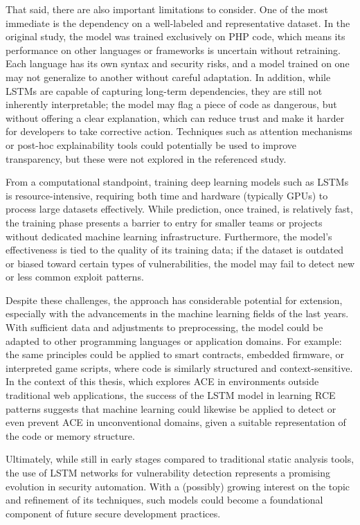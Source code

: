 \documentclass[a4paper]{usiinfbachelorproject}
\begin{document}
That said, there are also important limitations to consider. One of the most immediate is the dependency on a well-labeled and representative dataset. In the original study, the model was trained exclusively on PHP code, which means its performance on other languages or frameworks is uncertain without retraining. Each language has its own syntax and security risks, and a model trained on one may not generalize to another without careful adaptation. In addition, while LSTMs are capable of capturing long-term dependencies, they are still not inherently interpretable; the model may flag a piece of code as dangerous, but without offering a clear explanation, which can reduce trust and make it harder for developers to take corrective action. Techniques such as attention mechanisms or post-hoc explainability tools could potentially be used to improve transparency, but these were not explored in the referenced study.

From a computational standpoint, training deep learning models such as LSTMs is resource-intensive\cite{stacked-lstm-cost}, requiring both time and hardware (typically GPUs) to process large datasets effectively. While prediction, once trained, is relatively fast, the training phase presents a barrier to entry for smaller teams or projects without dedicated machine learning infrastructure. Furthermore, the model’s effectiveness is tied to the quality of its training data; if the dataset is outdated or biased toward certain types of vulnerabilities, the model may fail to detect new or less common exploit patterns.

Despite these challenges, the approach has considerable potential for extension, especially with the advancements in the machine learning fields of the last years. With sufficient data and adjustments to preprocessing, the model could be adapted to other programming languages or application domains. For example: the same principles could be applied to smart contracts, embedded firmware, or interpreted game scripts, where code is similarly structured and context-sensitive. In the context of this thesis, which explores ACE in environments outside traditional web applications, the success of the LSTM model in learning RCE patterns suggests that machine learning could likewise be applied to detect or even prevent ACE in unconventional domains, given a suitable representation of the code or memory structure.

Ultimately, while still in early stages compared to traditional static analysis tools, the use of LSTM networks for vulnerability detection represents a promising evolution in security automation. With a (possibly) growing interest on the topic and refinement of its techniques, such models could become a foundational component of future secure development practices.
\end{document}
